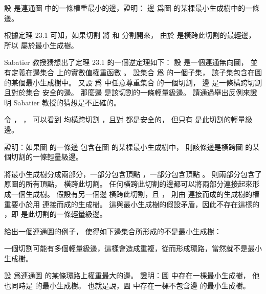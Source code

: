 \startsection[
  title={Growing a minimum spanning tree},
]

\startEXERCISE
設  是連通圖  中的一條權重最小的邊，證明：
邊  爲圖  的某棵最小生成樹中的一條邊。
\stopEXERCISE

\startANSWER
根據定理 23.1 可知，如果切割  將  和  分割開來，
由於  是橫跨此切割的最輕邊，所以  屬於最小生成樹。
\stopANSWER

\startEXERCISE
Sabatier 教授猜想出了定理 23.1 的一個逆定理如下：
設  是一個連通無向圖，
並有定義在邊集合  上的實數值權重函數 \m{\omega}。
設集合  爲  的一個子集，
該子集包含在圖  的某個最小生成樹中。
又設  爲  中任意尊重集合  的一個切割，
邊  是一條橫跨切割  且對於集合  安全的邊。
那麼邊  是該切割的一條輕量級邊。
請通過舉出反例來證明 Sabatier 教授的猜想是不正確的。
\stopEXERCISE

\startANSWER
令 ， ，
可以看到  均橫跨切割 ，且對  都是安全的，
但只有  是此切割的輕量級邊。

\externalfigure[output/e23_1_2-1]
\stopANSWER

\startEXERCISE[exercise:23.1-3]
證明：如果圖  的一條邊  包含在圖  的某棵最小生成樹中，
則該條邊是橫跨圖  的某個切割的一條輕量級邊。
\stopEXERCISE

\startANSWER
將最小生成樹分成兩部分，一部分包含頂點 ，一部分包含頂點 。
則兩部分包含了原圖的所有頂點，  橫跨此切割。
任何橫跨此切割的邊都可以將兩部分連接起來形成一個生成樹。
假設有另一個邊  橫跨此切割，且 ，
則由  連接而成的生成樹的權重要小於用  連接而成的生成樹。
這與最小生成樹的假設矛盾，因此不存在這樣的 ，即  是此切割的一條輕量級邊。
\stopANSWER

\startEXERCISE
給出一個連通圖的例子，
使得如下邊集合所形成的不是最小生成樹：
\startformula
{}
\stopformula
\stopEXERCISE

\startANSWER
一個切割可能有多個輕量級邊，這樣會造成重複，從而形成環路，當然就不是最小生成樹。
\stopANSWER

\startEXERCISE
設  爲連通圖  的某條環路上權重最大的邊。
證明：圖  中存在一棵最小生成樹，
他也同時是  的最小生成樹。
也就是說，圖  中存在一棵不包含邊  的最小生成樹。
\stopEXERCISE

